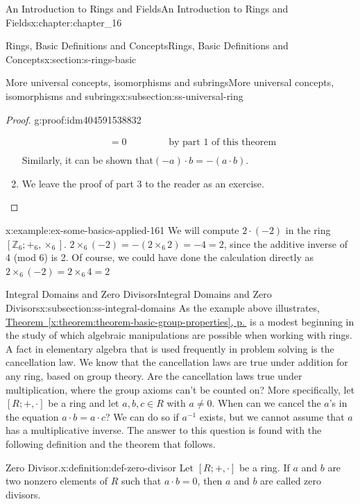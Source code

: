 \documentclass[twoside,10pt,]{book}
\newcommand{\xreffont}{\relax}
\numberwithin{equation}{section}
\begin{document}
\begin{chapterptx}{An Introduction to Rings and Fields}{}{An Introduction to Rings and Fields}{}{}{x:chapter:chapter_16}
\begin{sectionptx}{Rings, Basic Definitions and Concepts}{}{Rings, Basic Definitions and Concepts}{}{}{x:section:s-rings-basic}
\begin{subsectionptx}{More universal concepts, isomorphisms and subrings}{}{More universal concepts, isomorphisms and subrings}{}{}{x:subsection:ss-universal-ring}
\begin{proof}{}{g:proof:idm404591538832}
\begin{enumerate}[label=(\arabic*)]
\begin{equation*}
\begin{split}
& = 0\quad \quad \quad\quad \textrm{     by  part 1  of this  theorem}\\
\end{split}
\end{equation*}
Similarly, it can be shown that\((-a) \cdot  b = -(a \cdot  b)\).%
\item{}We leave the proof of part 3 to the reader as an exercise.%
\end{enumerate}
%
\end{proof}
\begin{example}{}{x:example:ex-some-basics-applied-161}%
We will compute \(2 \cdot (-2)\) in the ring \(\left[\mathbb{Z}_6;+_6,\times_6\right]\). \(2 \times_6 (-2) = -\left(2\times_6 2\right)= -4 = 2\), since the additive inverse of 4 (mod 6) is 2. Of course, we could have done the calculation directly as \(2 \times_6 (-2) = 2 \times_6 4 = 2\)%
\end{example}
\end{subsectionptx}
%
%
\typeout{************************************************}
\typeout{************************************************}
%
\begin{subsectionptx}{Integral Domains and Zero Divisors}{}{Integral Domains and Zero Divisors}{}{}{x:subsection:ss-integral-domains}
As the example above illustrates, \hyperref[x:theorem:theorem-basic-group-properties]{Theorem~{\xreffont\ref{x:theorem:theorem-basic-group-properties}}, p.\,\pageref{x:theorem:theorem-basic-group-properties}} is a modest beginning in the study of which algebraic manipulations are possible when working with rings. A fact in elementary algebra that is used frequently in problem solving is the cancellation law. We know that the cancellation laws are true under addition for any ring, based on group theory. Are the cancellation laws true under multiplication, where the group axioms can't be counted on? More specifically, let \([R; +, \cdot ]\) be a ring and let \(a, b, c\in R\) with \(a \neq 0\). When can we cancel the \(a\)'s in the equation \(a \cdot  b = a \cdot  c\)? We can  do so if \(a^{-1}\) exists, but we cannot assume that \(a\) has a multiplicative inverse. The answer to this question is found with the following definition and the theorem that follows.%
\begin{definition}{Zero Divisor.}{x:definition:def-zero-divisor}%
%
\label{g:notation:idm404591522176}%
Let \([R; +, \cdot ]\) be a ring.  If \(a\) and \(b\) are two nonzero elements of \(R\) such that \(a \cdot  b = 0\), then \(a\) and \(b\) are called zero divisors.%

\end{definition}
\end{subsectionptx}
\end{sectionptx}
\end{chapterptx}
\end{document}
